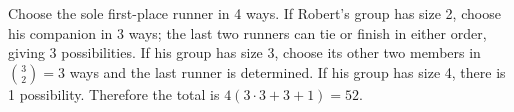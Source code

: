 Choose the sole first-place runner in 4 ways. If Robert's group has size 2, choose his companion in 3 ways; the last two runners can tie or finish in either order, giving 3 possibilities. If his group has size 3, choose its other two members in $\binom32=3$ ways and the last runner is determined. If his group has size 4, there is 1 possibility. Therefore the total is $4(3\cdot3+3+1)=\boxed{52}$.
